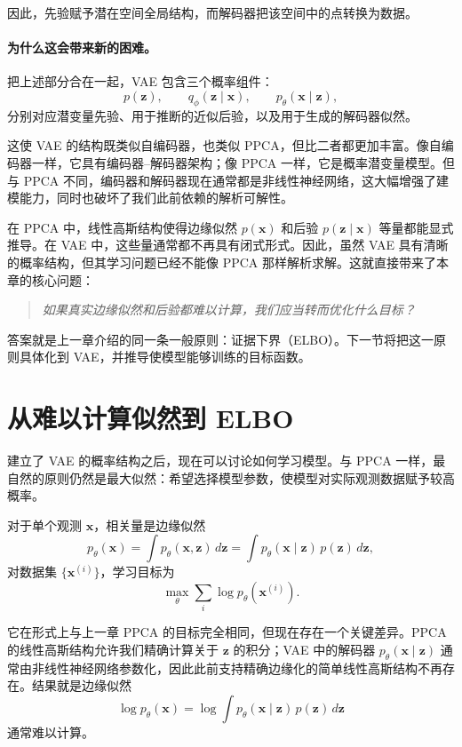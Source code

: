 因此，先验赋予潜在空间全局结构，而解码器把该空间中的点转换为数据。

\paragraph{为什么这会带来新的困难。}

把上述部分合在一起，VAE 包含三个概率组件：
\[
p(\mathbf{z}),
\qquad
q_{\phi}(\mathbf{z}\mid\mathbf{x}),
\qquad
p_{\theta}(\mathbf{x}\mid\mathbf{z}),
\]
分别对应潜变量先验、用于推断的近似后验，以及用于生成的解码器似然。

这使 VAE 的结构既类似自编码器，也类似 PPCA，但比二者都更加丰富。像自编码器一样，它具有编码器--解码器架构；像 PPCA 一样，它是概率潜变量模型。但与 PPCA 不同，编码器和解码器现在通常都是非线性神经网络，这大幅增强了建模能力，同时也破坏了我们此前依赖的解析可解性。

在 PPCA 中，线性高斯结构使得边缘似然 \(p(\mathbf{x})\) 和后验 \(p(\mathbf{z}\mid\mathbf{x})\) 等量都能显式推导。在 VAE 中，这些量通常都不再具有闭式形式。因此，虽然 VAE 具有清晰的概率结构，但其学习问题已经不能像 PPCA 那样解析求解。这就直接带来了本章的核心问题：
\begin{quote}
\emph{如果真实边缘似然和后验都难以计算，我们应当转而优化什么目标？}
\end{quote}

答案就是上一章介绍的同一条一般原则：证据下界（ELBO）。下一节将把这一原则具体化到 VAE，并推导使模型能够训练的目标函数。

\section{从难以计算似然到 ELBO}

建立了 VAE 的概率结构之后，现在可以讨论如何学习模型。与 PPCA 一样，最自然的原则仍然是最大似然：希望选择模型参数，使模型对实际观测数据赋予较高概率。

对于单个观测 \(\mathbf{x}\)，相关量是边缘似然
\[
p_{\theta}(\mathbf{x})
=
\int p_{\theta}(\mathbf{x},\mathbf{z})\,d\mathbf{z}
=
\int p_{\theta}(\mathbf{x}\mid\mathbf{z})\,p(\mathbf{z})\,d\mathbf{z},
\]
对数据集 \(\{\mathbf{x}^{(i)}\}\)，学习目标为
\[
\max_{\theta}\sum_i\log p_{\theta}(\mathbf{x}^{(i)}).
\]

它在形式上与上一章 PPCA 的目标完全相同，但现在存在一个关键差异。PPCA 的线性高斯结构允许我们精确计算关于 \(\mathbf{z}\) 的积分；VAE 中的解码器 \(p_{\theta}(\mathbf{x}\mid\mathbf{z})\) 通常由非线性神经网络参数化，因此此前支持精确边缘化的简单线性高斯结构不再存在。结果就是边缘似然
\[
\log p_{\theta}(\mathbf{x})
=
\log\int p_{\theta}(\mathbf{x}\mid\mathbf{z})\,p(\mathbf{z})\,d\mathbf{z}
\]
通常难以计算。

